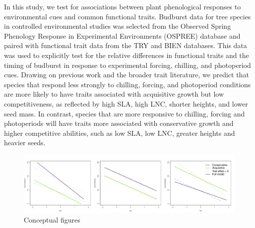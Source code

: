 \documentclass{article}\usepackage[]{graphicx}\usepackage[]{color}
\begin{document}
In this study, we test for associations between plant phenological responses to environmental cues and common functional traits. Budburst data for tree species in controlled environmental studies was selected from the Observed Spring Phenology Response in Experimental Environments (OSPREE) database and paired with functional trait data from the TRY and BIEN databases. This data was used to explicitly test for the relative differences in functional traits and the timing of budburst in response to experimental forcing, chilling, and photoperiod cues. Drawing on previous work and the broader trait literature, we predict that species that respond less strongly to chilling, forcing, and photoperiod conditions are more likely to have traits associated with acquisitive growth but low competitiveness, as reflected by high SLA, high LNC, shorter heights, and lower seed mass. In contrast, species that are more responsive to chilling, forcing and photoperiods will have traits more associated with conservative growth and higher competitive abilities, such as low SLA, low LNC, greater heights and heavier seeds. 


\begin{figure}[h!]
    \centering
 \includegraphics[width=\textwidth]{..//..//analyses/traits/figures/conceptFig.pdf} 
    \caption{Conceptual figures}
    \label{config}
\end{figure}
\end{document}
